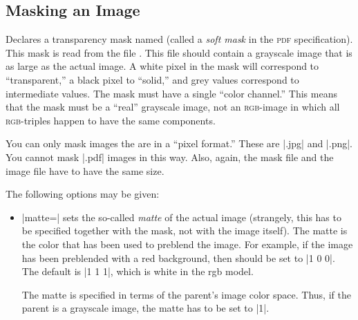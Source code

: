 \subsection{Masking an Image}


\begin{command}{\pgfdeclaremask{}}
  Declares a transparency mask named  (called a
  \emph{soft mask} in the \textsc{pdf} specification). This mask is
  read from the file . This file should contain a
  grayscale image that is as large as the actual image. A white
  pixel in the mask will correspond to ``transparent,'' a black pixel
  to ``solid,'' and grey values correspond to intermediate values. The
  mask must have a single ``color channel.'' This means that the
  mask must be a ``real'' grayscale image, not an \textsc{rgb}-image
  in which all \textsc{rgb}-triples happen to have the same
  components.

  You can only mask images the are in a ``pixel format.'' These are
  |.jpg| and |.png|.  You cannot mask |.pdf| images in this way. Also,
  again, the mask file and the image file have to have the same size.

  The following options may be given:
  \begin{itemize}
  \item |matte=| sets the so-called
    \emph{matte} of the actual image (strangely, this has to be
    specified together with the mask, not with the image itself). The
    matte is the color that has been used to preblend the image. For
    example, if the image has been preblended with a red background,
    then  should be set to |{1 0 0}|. The
    default is |{1 1 1}|, which is white in the rgb model.

    The matte is specified in terms of the parent's image color
    space. Thus, if the parent is a grayscale image, the matte has to
    be set to |{1}|.
  \end{itemize}
  \example
\begin{codeexample}[]
\hbox{\hskip-14cm\hskip1cm
\hskip1cm
\hskip1cm
}
\end{codeexample}
\end{command}

